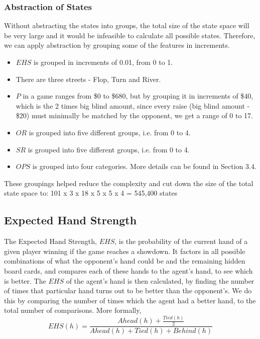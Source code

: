 \documentclass{article}
\begin{document}
\subsubsection{Abstraction of States}
Without abstracting the states into groups, the total size of the state space will be very large and it would be infeasible to calculate all possible states. Therefore, we can apply abstraction by grouping some of the features in increments.
\begin{itemize}
  \item $EHS$ is grouped in increments of 0.01, from 0 to 1.
  \item There are three streets - Flop, Turn and River.
  \item $P$ in a game ranges from \$0 to \$680, but by grouping it in increments of \$40, which is the 2 times big blind amount, since every raise (big blind amount - \$20) must minimally be matched by the opponent, we get a range of 0 to 17.
  \item $OR$ is grouped into five different groups, i.e. from 0 to 4.
  \item $SR$ is grouped into five different groups, i.e. from 0 to 4.
  \item $OPS$ is grouped into four categories. More details can be found in Section 3.4.
\end{itemize}

These groupings helped reduce the complexity and cut down the size of the total state space to: 101 x 3 x 18 x 5 x 5 x 4 = 545,400 states


\subsection{Expected Hand Strength}

The Expected Hand Strength, $EHS$, is the probability of the current hand of a given player winning if the game reaches a showdown. It factors in all possible combinations of what the opponent's hand could be and the remaining hidden board cards, and compares each of these hands to the agent's hand, to see which is better. The $EHS$ of the agent's hand is then calculated, by finding the number of times that particular hand turns out to be better than the opponent's. We do this by comparing the number of times which the agent had a better hand, to the total number of comparisons. More formally,
\begin{displaymath}
  EHS(h)= \frac{Ahead(h)+\frac{Tied(h)}{2}}{Ahead(h) + Tied(h) + Behind(h)}
\end{displaymath}
\end{document}
